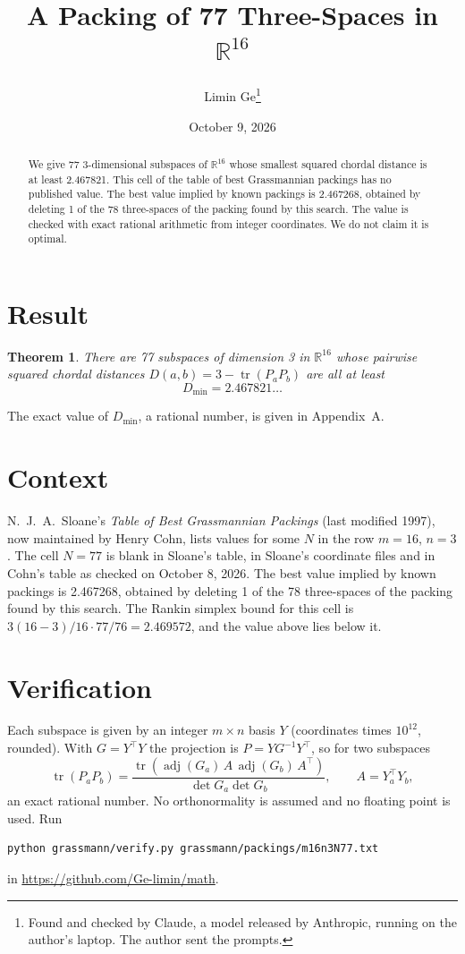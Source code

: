 \documentclass[11pt,a4paper]{article}
\title{A Packing of 77 Three-Spaces in $\mathbb{R}^{16}$}
\author{Limin Ge\thanks{Found and checked by Claude, a model released by Anthropic, running on the author's laptop. The author sent the prompts.}}
\date{October 9, 2026}
\newtheorem*{theorem}{Theorem}
\begin{document}
\maketitle
\begin{abstract}
We give 77 3-dimensional subspaces of $\mathbb{R}^{16}$ whose smallest squared chordal distance is at least 2.467821. This cell of the table of best Grassmannian packings has no published value. The best value implied by known packings is 2.467268, obtained by deleting 1 of the 78 three-spaces of the packing found by this search. The value is checked with exact rational arithmetic from integer coordinates. We do not claim it is optimal.
\end{abstract}

\section{Result}
\begin{theorem}
There are 77 subspaces of dimension 3 in $\mathbb{R}^{16}$ whose pairwise squared chordal distances $D(a,b) = 3 - \operatorname{tr}(P_aP_b)$ are all at least
\[ D_{\min} = 2.467821\ldots \]
\end{theorem}
The exact value of $D_{\min}$, a rational number, is given in Appendix~A.


\section{Context}
N.~J.~A.~Sloane's \emph{Table of Best Grassmannian Packings} (last modified 1997), now maintained by Henry Cohn, lists values for some $N$ in the row $m=16$, $n=3$. The cell $N=77$ is blank in Sloane's table, in Sloane's coordinate files and in Cohn's table as checked on October 8, 2026. The best value implied by known packings is 2.467268, obtained by deleting 1 of the 78 three-spaces of the packing found by this search. The Rankin simplex bound for this cell is $3(16-3)/16\cdot 77/76 = 2.469572$, and the value above lies below it.


\section{Verification}
Each subspace is given by an integer $m\times n$ basis $Y$ (coordinates times $10^{12}$, rounded). With $G=Y^\top Y$ the projection is $P=YG^{-1}Y^\top$, so for two subspaces
\[ \operatorname{tr}(P_aP_b)=\frac{\operatorname{tr}(\operatorname{adj}(G_a)\,A\,\operatorname{adj}(G_b)\,A^\top)}{\det G_a\det G_b},\qquad A=Y_a^\top Y_b, \]
an exact rational number. No orthonormality is assumed and no floating point is used. Run
\begin{verbatim}
python grassmann/verify.py grassmann/packings/m16n3N77.txt
\end{verbatim}
in \url{https://github.com/Ge-limin/math}.
\end{document}
